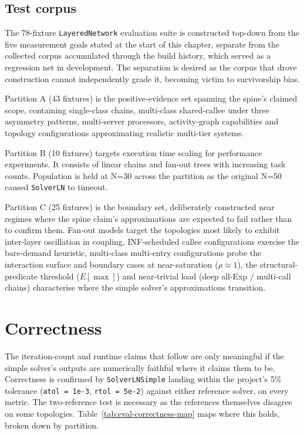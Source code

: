 \subsection{Test corpus}
\label{sec:eval-corpus}

The 78-fixture \texttt{LayeredNetwork} evaluation suite is constructed top-down from the five measurement goals stated at the start of this chapter, separate from the collected corpus accumulated through the build history, which served as a regression net in development. The separation is desired as the corpus that drove construction cannot independently grade it, becoming victim to survivorship bias. 

Partition A (43 fixtures) is the positive-evidence set spanning the spine's claimed scope, containing single-class chains, multi-class shared-callee under three asymmetry patterns, multi-server processors, activity-graph capabilities and topology configurations approximating realistic multi-tier systems.

Partition B (10 fixtures) targets execution time scaling for performance experiments. It consists of linear chains and fan-out trees with increasing task counts. Population is held at N=30 across the partition as the original N=50 caused \texttt{SolverLN} to timeout. 

Partition C (25 fixtures) is the boundary set, deliberately constructed near regimes where the spine claim's approximations are expected to fail rather than to confirm them. Fan-out models target the topologies most likely to exhibit inter-layer oscillation in coupling, INF-scheduled callee configurations exercise the bare-demand heuristic, multi-class multi-entry configurations probe the interaction surface and boundary cases at near-saturation ($\rho \approx 1$), the structural-predicate threshold ($E[\max]$) and near-trivial load (deep all-Exp / multi-call chains) characterise where the simple solver's approximations transition.

\section{Correctness}
\label{sec:eval-correctness} 

The iteration-count and runtime claims that follow are only meaningful if the simple solver's outputs are numerically faithful where it claims them to be. Correctness is confirmed by \texttt{SolverLNSimple} landing within the project's 5\% tolerance (\texttt{atol = 1e-3}, \texttt{rtol = 5e-2}) against either reference solver, on every metric. The two-reference test is necessary as the references themselves disagree on some topologies. Table~\ref{tab:eval-correctness-map} maps where this holds, broken down by partition.

